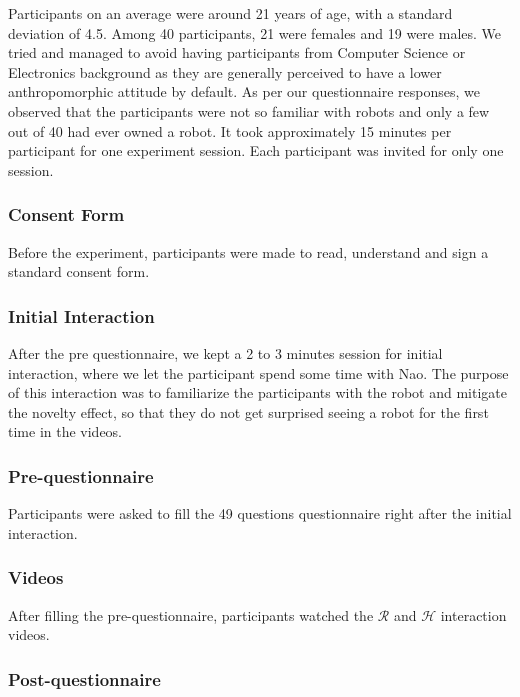 \documentclass{acm_proc_article-sp}
\begin{document}
Participants on an average were around 21 years of age, with a standard
deviation of 4.5. Among 40 participants, 21 were females and 19 were males.  We
tried and managed to avoid having participants from Computer Science or
Electronics background as they are generally perceived to have a lower
anthropomorphic attitude by default. As per our questionnaire responses, we
observed that the participants were not so familiar with robots and only a few
out of 40 had ever owned a robot.  It took approximately 15 minutes per
participant for one experiment session.  Each participant was invited for only
one session. 

\subsubsection{Consent Form}

Before the experiment, participants were made to read, understand and sign a
standard consent form.

\subsubsection{Initial Interaction}

After the pre questionnaire, we kept a 2 to 3 minutes session for initial
interaction, where we let the participant spend some time with Nao.
The purpose of this interaction was to familiarize the participants with the
robot and mitigate the novelty effect, so that they do not get surprised seeing
a robot for the first time in the videos.

\subsubsection{Pre-questionnaire}

Participants were asked to fill the 49 questions questionnaire right after the
initial interaction.

\subsubsection{Videos}

After filling the pre-questionnaire, participants watched the $\mathcal{R}$ and
$\mathcal{H}$ interaction videos.

\subsubsection{Post-questionnaire}
\end{document}
